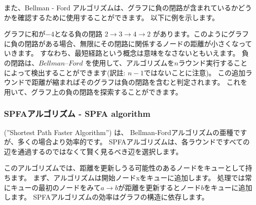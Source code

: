 また、Bellman - Ford アルゴリズムは、グラフに負の閉路が含まれているかどうかを確認するために使用することができます。
以下に例を示します。
\begin{center}
\end{center}
\noindent
グラフに和が$-4$となる負の閉路
$2 \rightarrow 3 \rightarrow 4 \rightarrow 2$
があります。このようにグラフに負の閉路がある場合、無限にその閉路に関係するノードの距離が小さくなっていきます。
すなわち、最短経路という概念は意味をなさないともいえます。
負の閉路は、$Bellman–Ford$ を使用して、アルゴリズムを$n$ラウンド実行することによって検出することができます(訳註: $n-1$ではないことに注意)。
この追加ラウンドで距離が縮まればそのグラフは負の閉路を含むと判定されます。
これを用いて、グラフ上の負の閉路を探索することができます。

\subsubsection{SPFAアルゴリズム - SPFA algorithm}


 (''Shortest Path Faster Algorithm'') \cite{fan94}は、
Bellman-Fordアルゴリズムの亜種ですが、多くの場合より効率的です。
SPFAアルゴリズムは、各ラウンドですべての辺を通過するのではなくて賢く見るべき辺を選択します。

このアルゴリズムでは、距離を更新しうる可能性のあるノードをキューとして持ちます。
まず、アルゴリズムは開始ノードxをキューに追加します。
処理では常にキューの最初のノードをみて$a \rightarrow b$が距離を更新するとノード$b$をキューに追加します。
SPFAアルゴリズムの効率はグラフの構造に依存します。


%
%


